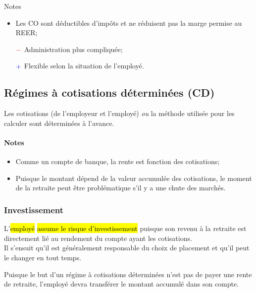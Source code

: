 \documentclass[10pt, french]{article}
\begin{document}
\begin{multicols*}{3}
\begin{definitionNOHFILL}
Notes
\begin{itemize}[leftmargin = *]
	\item	Les CO sont déductibles d'impôts et ne réduisent pas la marge permise au REER;
	\item[$\color{red}-$]	Administration plus compliquée;
	\item[$\color{blue}+$]	Flexible selon la situation de l'employé.
\end{itemize}
\end{definitionNOHFILL}

\columnbreak

\subsection*{Régimes à cotisations déterminées (CD)}

\begin{definitionNOHFILL}[Description]
Les cotisations (de l'employeur et l'employé) \textit{ou} la méthode utilisée pour les calculer sont déterminées à l'avance.

\paragraph{Notes}
\begin{itemize}[leftmargin = *]
	\item	Comme un compte de banque, la rente est fonction des cotisations;
	\item	Puisque le montant dépend de la valeur accumulée des cotisations, le moment de la retraite peut être problématique s'il y a une chute des marchés.
\end{itemize}
\end{definitionNOHFILL}


\subsubsection*{Investissement}

L'\hl{employé} \hl{assume le risque d'investissement} puisque son revenu à la retraite est directement lié au rendement du compte ayant les cotisations. \\

Il s'ensuit 	qu'il est généralement responsable du choix de placement et qu'il peut le changer en tout temps.

Puisque le but d'un régime à cotisations déterminées n'est pas de payer une rente de retraite, l'employé devra transférer le montant accumulé dans son compte.


\end{multicols*}
\end{document}
